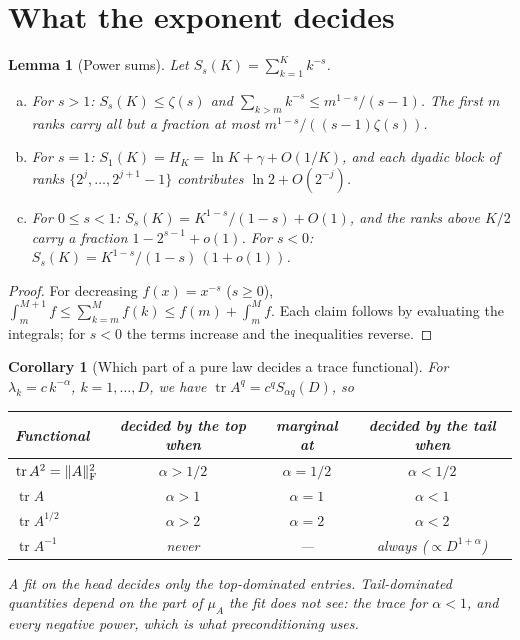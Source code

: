 \documentclass[11pt,a4paper]{article}
\DeclareMathOperator{\tr}{tr}
\DeclarePairedDelimiter{\norm}{\lVert}{\rVert}
\newcommand{\F}{\mathrm{F}}
\theoremstyle{plain}
\newtheorem{lemma}[proposition]{Lemma}
\newtheorem{corollary}[proposition]{Corollary}
\theoremstyle{definition}
\theoremstyle{remark}
\begin{document}
\section{What the exponent decides}\label{sec:controls}

\begin{lemma}[Power sums]\label{lem:sums}
Let $S_s(K)=\sum_{k=1}^K k^{-s}$.
\begin{enumerate}[(a)]
\item For $s>1$: $S_s(K)\le\zeta(s)$ and $\sum_{k>m}k^{-s}\le m^{1-s}/(s-1)$. The first $m$ ranks carry all but a
  fraction at most $m^{1-s}/((s-1)\zeta(s))$.
\item For $s=1$: $S_1(K)=H_K=\ln K+\gamma+O(1/K)$, and each dyadic block of ranks $\{2^j,\dots,2^{j+1}-1\}$
  contributes $\ln2+O(2^{-j})$.
\item For $0\le s<1$: $S_s(K)=K^{1-s}/(1-s)+O(1)$, and the ranks above $K/2$ carry a fraction $1-2^{s-1}+o(1)$.
  For $s<0$: $S_s(K)=K^{1-s}/(1-s)\,(1+o(1))$.
\end{enumerate}
\end{lemma}
\begin{proof}
For decreasing $f(x)=x^{-s}$ ($s\ge0$), $\int_m^{M+1}f\le\sum_{k=m}^Mf(k)\le f(m)+\int_m^Mf$. Each claim follows by
evaluating the integrals; for $s<0$ the terms increase and the inequalities reverse.
\end{proof}

\begin{corollary}[Which part of a pure law decides a trace functional]\label{cor:decides}
For $\lambda_k=c\,k^{-\alpha}$, $k=1,\dots,D$, we have $\tr A^q=c^qS_{\alpha q}(D)$, so
\begin{center}
\begin{tabular}{lccc}
\toprule
Functional & decided by the top when & marginal at & decided by the tail when\\
\midrule
$\tr A^2=\norm{A}_\F^2$ & $\alpha>1/2$ & $\alpha=1/2$ & $\alpha<1/2$\\
$\tr A$ & $\alpha>1$ & $\alpha=1$ & $\alpha<1$\\
$\tr A^{1/2}$ & $\alpha>2$ & $\alpha=2$ & $\alpha<2$\\
$\tr A^{-1}$ & never & --- & always ($\propto D^{1+\alpha}$)\\
\bottomrule
\end{tabular}
\end{center}
A fit on the head decides only the top-dominated entries. Tail-dominated quantities depend on the part of $\mu_A$ the
fit does not see: the trace for $\alpha<1$, and every negative power, which is what preconditioning uses.
\end{corollary}
\end{document}

